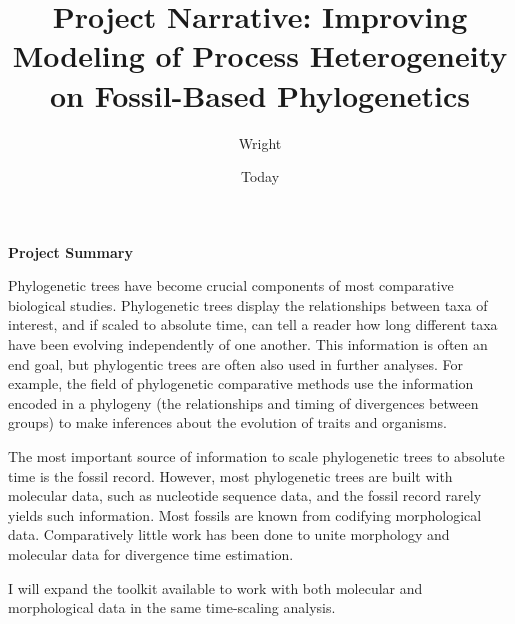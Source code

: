 \documentclass[]{article}
\begin{document}
\title{Project Narrative: Improving Modeling of Process Heterogeneity on Fossil-Based Phylogenetics}
\author{Wright}
\date{Today}
\maketitle

\textbf{Project Summary}

Phylogenetic trees have become crucial components of most comparative biological studies. 
Phylogenetic trees display the relationships between taxa of interest, and if scaled to absolute time, can tell a reader how long different taxa have been evolving independently of one another. 
This information is often an end goal, but phylogentic trees are often also used in further analyses.
For example, the field of phylogenetic comparative methods use the information encoded in a phylogeny (the relationships and timing of divergences between groups) to make inferences about the evolution of traits and organisms.\par
The most important source of information to scale phylogenetic trees to absolute time is the fossil record. 
However, most phylogenetic trees are built with molecular data, such as nucleotide sequence data, and the fossil record rarely yields such information.
Most fossils are known from codifying morphological data.
Comparatively little work has been done to unite morphology and molecular data for divergence time estimation. \par
I will expand the toolkit available to work with both molecular and morphological data in the same time-scaling analysis. 
\end{document}
